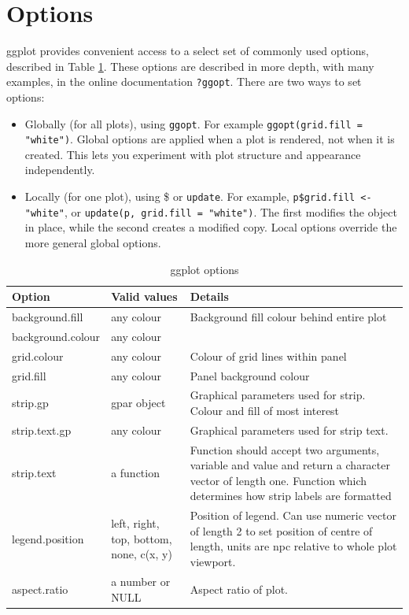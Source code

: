\section{Options}\label{sec:options}

ggplot provides convenient access to a select set of commonly used options, described in Table \ref{tbl:options}.  These options are described in more depth, with many examples, in the online documentation {\tt ?ggopt}.
There are two ways to set options:

\begin{itemize}
  \item Globally (for all plots), using {\tt ggopt}.  For example {\tt ggopt(grid.fill = "white")}.   Global options are applied when a plot is rendered, not when it is created.  This lets you experiment with plot structure and appearance independently.

  \item Locally (for one plot), using \$ or {\tt update}.  For example, {\tt p\$grid.fill <- "white"}, or {\tt update(p, grid.fill = "white")}.  The first modifies the object in place, while the second creates a modified copy. Local options override the more general global options.
\end{itemize}     


\begin{table}
\begin{tabular}{lll}
Option & Valid values & Details \\
\hline
background.fill    & any colour & Background fill colour behind entire plot\\
background.colour  & any colour & \\
grid.colour        & any colour & Colour of grid lines within panel \\
grid.fill          & any colour & Panel background colour \\
strip.gp           & gpar object & Graphical parameters used for strip. Colour and fill of most interest \\
strip.text.gp      & any colour & Graphical parameters used for strip text. \\
strip.text         & a function & Function should accept two arguments, variable and value and return a character vector of length one. Function which determines how strip labels are formatted \\
legend.position    & left, right, top, bottom, none, c(x, y) & Position of legend.  Can use numeric vector of length 2 to set position of centre of length, units are npc relative to whole plot viewport. \\
aspect.ratio       & a number or NULL & Aspect ratio of plot. \\
\hline
\end{tabular}
  \caption{ggplot options}
  \label{tbl:options}
\end{table}

